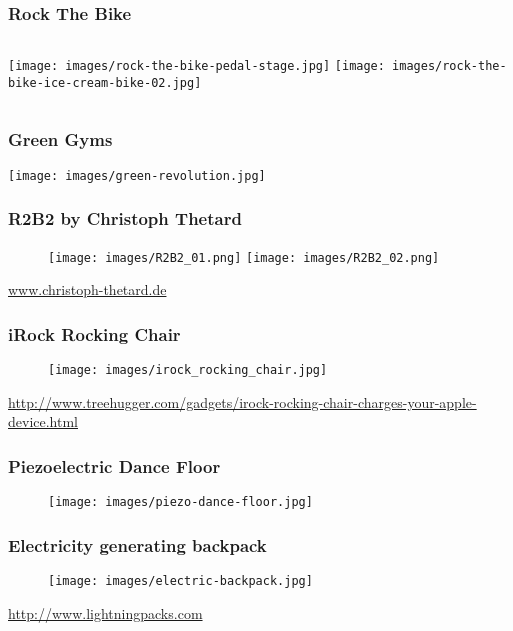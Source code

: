 \documentclass[]{beamer}
\begin{document}
%
\frame
{
  \frametitle{Rock The Bike}
  \begin{center}
    \begin{columns}[t]
      \column{5cm}
      \texttt{[image: images/rock-the-bike-pedal-stage.jpg]}
      \column{5cm}
      \texttt{[image: images/rock-the-bike-ice-cream-bike-02.jpg]}
    \end{columns}
  \end{center}
}
%
\frame
{
    \frametitle{Green Gyms}
    \begin{center}
        \texttt{[image: images/green-revolution.jpg]}
    \end{center}
}
%
\frame
{
    \frametitle{R2B2 by Christoph Thetard}
    \begin{center}
        \begin{figure}[]
            \texttt{[image: images/R2B2\_01.png]}
            \texttt{[image: images/R2B2\_02.png]}
        \end{figure}
        \url{www.christoph-thetard.de}
    \end{center}
}
%
\frame
{
    \frametitle{iRock Rocking Chair}
    \begin{center}
        \begin{figure}[]
            \texttt{[image: images/irock\_rocking\_chair.jpg]}
        \end{figure}
        \url{http://www.treehugger.com/gadgets/irock-rocking-chair-charges-your-apple-device.html}
    \end{center}
}
%
\frame
{
    \frametitle{Piezoelectric Dance Floor}
    \begin{center}
        \begin{figure}[]
            \texttt{[image: images/piezo-dance-floor.jpg]}
        \end{figure}
    \end{center}
}
%
\frame
{
    \frametitle{Electricity generating backpack}
    \begin{center}
        \begin{figure}[]
            \texttt{[image: images/electric-backpack.jpg]}
        \end{figure}
        \url{http://www.lightningpacks.com}
    \end{center}
}
%
\end{document}

